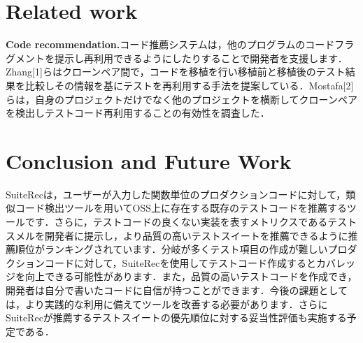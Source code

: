 \documentclass[conference]{IEEEtran}
\begin{document}
\section{Related work}
\textbf{Code recommendation.}コード推薦システムは，他のプログラムのコードフラグメントを提示し再利用できるようにしたりすることで開発者を支援します．Zhang[1]らはクローンペア間で，コードを移植を行い移植前と移植後のテスト結果を比較しその情報を基にテストを再利用する手法を提案している．Mostafa[2]らは，自身のプロジェクトだけでなく他のプロジェクトを横断してクローンペアを検出しテストコード再利用することの有効性を調査した．

\section{Conclusion and Future Work}

SuiteRecは，ユーザーが入力した関数単位のプロダクションコードに対して，類似コード検出ツールを用いてOSS上に存在する既存のテストコードを推薦するツールです．さらに，テストコードの良くない実装を表すメトリクスであるテストスメルを開発者に提示し，より品質の高いテストスイートを推薦できるように推薦順位がランキングされています．分岐が多くテスト項目の作成が難しいプロダクションコードに対して，SuiteRecを使用してテストコード作成するとカバレッジを向上できる可能性があります．また，品質の高いテストコードを作成でき，開発者は自分で書いたコードに自信が持つことができます．今後の課題としては，より実践的な利用に備えてツールを改善する必要があります．さらにSuiteRecが推薦するテストスイートの優先順位に対する妥当性評価も実施する予定である．
\end{document}
